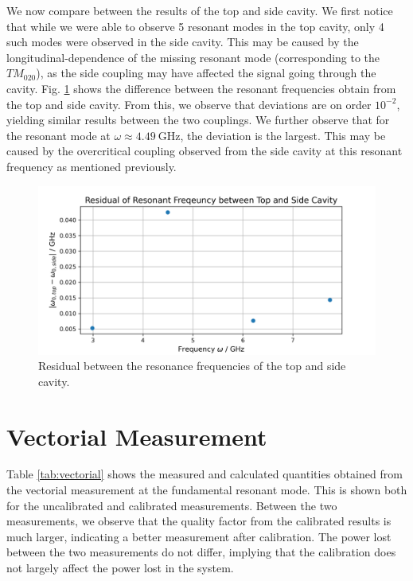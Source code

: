 \documentclass[a4paper]{report}
\numberwithin{equation}{section}
\begin{document}
We now compare between the results of the top and side cavity. We first notice that while we were able to observe 5 resonant modes in the top cavity, only 4 such modes
were observed in the side cavity. This may be caused by the longitudinal-dependence of the missing resonant mode (corresponding to the $TM_{020}$), as the side coupling
may have affected the signal going through the cavity. Fig. \ref{fig:scalar_residual} shows the difference between the resonant frequencies obtain from the top and side cavity.
From this, we observe that deviations are on order $10^{-2}$, yielding similar results between the two couplings. We further observe that for the resonant mode at 
$\omega \approx \SI{4.49}{\giga\hertz}$, the deviation is the largest. This may be caused by the overcritical coupling observed from the side cavity at this resonant frequency
as mentioned previously.\par 


\begin{figure}[h!]
	\centering
	\includegraphics[width=0.6\columnwidth]{scalar_residual_topside.png}
	\caption{Residual between the resonance frequencies of the top and side cavity. }

	\label{fig:scalar_residual}
\end{figure}

\section{Vectorial Measurement}

Table \ref{tab:vectorial} shows the measured and calculated quantities obtained from the vectorial measurement at the fundamental resonant mode. This is 
shown both for the uncalibrated and calibrated measurements. Between the two measurements, we observe that the quality factor from the calibrated results
is much larger, indicating a better measurement after calibration. The power lost between the two measurements do not differ, implying that the calibration
does not largely affect the power lost in the system. \par 
\end{document}
